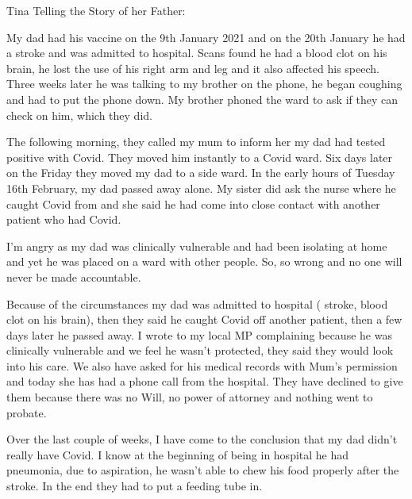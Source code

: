Tina Telling the Story of her Father:

My dad had his vaccine on the 9th January 2021 and on the 20th January he had a
stroke and was admitted to hospital. Scans found he had a blood clot on his
brain, he lost the use of his right arm and leg and it also affected his
speech. Three weeks later he was talking to my brother on the phone, he began
coughing and had to put the phone down. My brother phoned the ward to ask if
they can check on him, which they did.

The following morning, they called my mum to inform her my dad had tested
positive with Covid. They moved him instantly to a Covid ward. Six days later on
the Friday they moved my dad to a side ward. In the early hours of Tuesday 16th
February, my dad passed away alone. My sister did ask the nurse where he caught
Covid from and she said he had come into close contact with another patient who
had Covid.

I’m angry as my dad was clinically vulnerable and had been isolating at home and
yet he was placed on a ward with other people. So, so wrong and no one will
never be made accountable.

Because of the circumstances my dad was admitted to hospital ( stroke, blood
clot on his brain), then they said he caught Covid off another patient, then a
few days later he passed away. I wrote to my local MP complaining because he was
clinically vulnerable and we feel he wasn’t protected, they said they would look
into his care. We also have asked for his medical records with Mum’s permission
and today she has had a phone call from the hospital. They have declined to give
them because there was no Will, no power of attorney and nothing went to
probate.

Over the last couple of weeks, I have come to the conclusion that my dad didn’t
really have Covid. I know at the beginning of being in hospital he had
pneumonia, due to aspiration, he wasn’t able to chew his food properly after the
stroke. In the end they had to put a feeding tube in.

